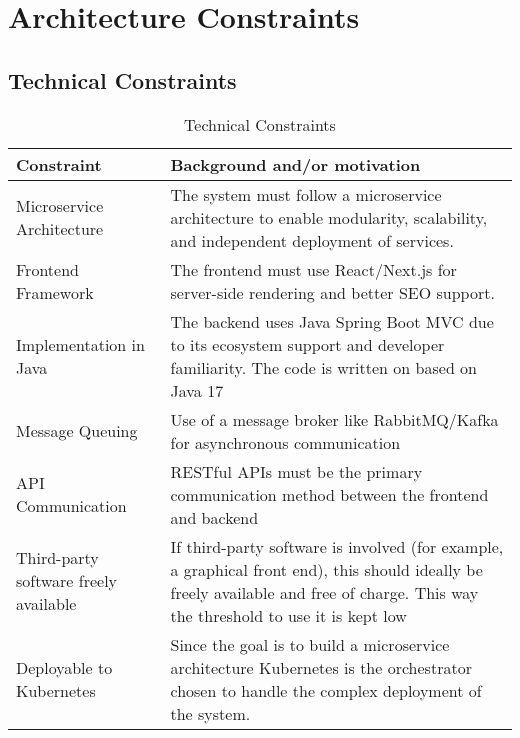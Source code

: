\hypertarget{section-architecture-constraints}{%
\section{Architecture
Constraints}\label{section-architecture-constraints}}

\subsection{Technical Constraints}
\label{subsection:technical-constraints}

\begin{table}[htbp]
    \centering
    \begin{tabularx}{1\textwidth} {
        | >{\raggedright\arraybackslash}X
        | >{\raggedleft\arraybackslash}X | }
        \hline
        Constraint & Background and/or motivation \\
        \hline
        Microservice Architecture & The system must follow a microservice architecture to enable modularity, scalability, and independent deployment of services. \\
        \hline
        Frontend Framework & The frontend must use React/Next.js for server-side rendering and better SEO support. \\
        \hline
        Implementation in Java & The backend uses Java Spring Boot MVC due to its ecosystem support and developer familiarity. The code is written on based on Java 17 \\
        \hline
        Message Queuing & Use of a message broker like RabbitMQ/Kafka for asynchronous communication \\
        \hline
        API Communication & RESTful APIs must be the primary communication method between the frontend and backend \\
        \hline
        Third-party software freely available & If third-party software is involved (for example, a graphical front end), this should ideally be freely available and free of charge. This way the threshold to use it is kept low \\
        \hline
         Deployable to Kubernetes & Since the goal is to build a microservice architecture Kubernetes is the orchestrator chosen to handle the complex deployment of the system. \\
         \hline
    \end{tabularx}
    \caption{Technical Constraints}
    \label{tab:technical-constraints}
\end{table}

